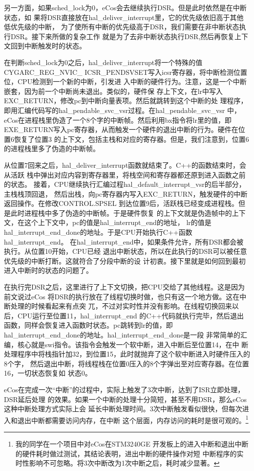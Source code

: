 另一方面，如果sched\_lock为0，eCos会去继续执行DSR。但是此时依然是在中断状态，如
果将DSR直接放在hal\_deliver\_interrupt里，它的优先级依旧高于其他低优先级的中断，
为了使所有中断的优先级高于DSR，我们需要在非中断状态执行DSR。接下来所做的复杂工作
就是为了去非中断状态执行DSR,然后再恢复上下文回到中断触发时的状态。

在判断sched\_lock为0之后，hal\_deliver\_interrupt将一个特殊的值CYGARC\_REG\_NVIC\_
ICSR\_PENDSVSET写入icsr寄存器，将中断检测位置位，CPU检测到一个新的中断，引发进
入中断的硬件行为。注意，这是一个中断嵌套，因为前一个中断尚未退出。类似的，硬件保
存上下文，在lr中写入EXC\_RETURN，修改pc到中断向量表项。然后就跳转到这个中断的处
理程序，即用汇编代码写的hal\_pendable\_svc\_vsr过程。在hal\_pendable\_svc\_vsr
中，eCos在进程栈里伪造了一个8个字的中断帧。然后利用bx指令将lr里的值，即
EXE\_RETURN写入pc寄存器，从而触发一个硬件的退出中断的行为。硬件在位置6恢复了位置3
的上下文，包括主栈和对应的寄存器。但是，我们注意到，位置6的进程栈里多了伪造的中断帧。

从位置7回来之后，hal\_deliver\_interrupt函数就结束了。C++的函数结束时，会从活跃
栈中弹出对应内容到寄存器里，将栈空间和寄存器都还原到进入函数之前的状态。\cite{AAPCS}
接着，CPU继续执行汇编过程hal\_default\_interrupt\_vsr的后半部分，主栈栈顶回退，
然后出栈，向pc寄存器内写入EXC\_RETURN，触发硬件的中断返回操作。在修改CONTROL.SPSEL
到达位置9后，活跃栈已经变成进程栈。但是此时进程栈中多了伪造的中断帧。于是硬件恢复
的上下文就是伪造帧中的上下文，在这个上下文中，pc的值是hal\_interrupt\_end的地址，
lr的值是hal\_interrupt\_end\_done的地址。于是CPU开始执行C++函数hal\_interrupt\_end。
在hal\_interrupt\_end中，如果条件允许，所有DSR都会被执行。从位置10开始，CPU已经
退出中断状态，所以在此执行的DSR可以被任意优先级的中断打断。这就符合了分段中断的设
计初衷。接下里就是如何回到最初进入中断时的状态的问题了。

在执行完DSR之后，这里进行了上下文切换，把CPU交给了其他线程。这是因为前文说过eCos
将DSR的执行放在了线程切换时做，也只有这一个地方做。这在中断处理的时候看起来有点突
兀，不过对实时性并没有影响。在线程切换回来以后，CPU运行至位置11，hal\_interrupt\_end
的C++代码就执行完毕，然后退出函数，同样会恢复进入函数时状态。pc跳转到lr的值，即
hal\_interrupt\_end\_done的地址。\cite{AAPCS}hal\_interrupt\_end\_done是一段
非常简单的汇编，核心就是swi指令。该指令会触发一个软中断，进入中断后至位置14，在中
断处理程序中将栈指针加32，到位置15，此时就抛弃了这个软中断进入时硬件压入的8个字，
然后退出中断，将线程栈在位置0压入的8个字弹出至对应寄存器。在位置16，一切状态恢复如
状态0。

eCos在完成一次“中断”的过程中，实际上触发了3次中断，达到了ISR立即处理，DSR延后处理
的效果。如果一个中断的处理十分简短，甚至不用DSR，那么eCos这种中断处理方式实际上会
延长中断处理时间。3次中断触发看似很快，但每次进入和退出中断都需要访问内存，在中断
这个层面，内存访问的耗时是很可观的。\footnote{我的同学在一个项目中对eCos在STM3240GE
开发板上的进入中断和退出中断的硬件耗时做过测试，其结论表明，进出中断的硬件操作对短
中断程序的实时性影响不可忽略。将3次中断改为1次中断之后，耗时减少显著。}

